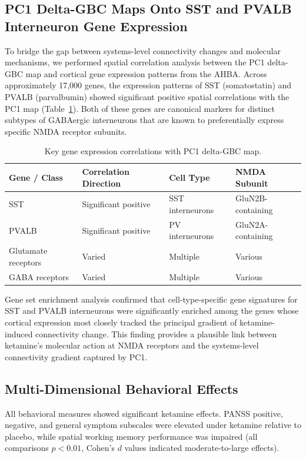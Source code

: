 \documentclass[12pt]{article}
\begin{document}
\subsection{PC1 Delta-GBC Maps Onto SST and PVALB Interneuron Gene Expression}

To bridge the gap between systems-level connectivity changes and molecular mechanisms, we performed spatial correlation analysis between the PC1 delta-GBC map and cortical gene expression patterns from the AHBA. Across approximately 17,000 genes, the expression patterns of SST (somatostatin) and PVALB (parvalbumin) showed significant positive spatial correlations with the PC1 map (Table~\ref{tab:gene_expression}). Both of these genes are canonical markers for distinct subtypes of GABAergic interneurons that are known to preferentially express specific NMDA receptor subunits.

\begin{table}[ht]
\centering
\caption{Key gene expression correlations with PC1 delta-GBC map.}
\label{tab:gene_expression}
\begin{tabular}{llll}
\toprule
Gene / Class & Correlation Direction & Cell Type & NMDA Subunit \\
\midrule
SST & Significant positive & SST interneurons & GluN2B-containing \\
PVALB & Significant positive & PV interneurons & GluN2A-containing \\
Glutamate receptors & Varied & Multiple & Various \\
GABA receptors & Varied & Multiple & Various \\
\bottomrule
\end{tabular}
\end{table}

Gene set enrichment analysis confirmed that cell-type-specific gene signatures for SST and PVALB interneurons were significantly enriched among the genes whose cortical expression most closely tracked the principal gradient of ketamine-induced connectivity change. This finding provides a plausible link between ketamine's molecular action at NMDA receptors and the systems-level connectivity gradient captured by PC1.

\subsection{Multi-Dimensional Behavioral Effects}

All behavioral measures showed significant ketamine effects. PANSS positive, negative, and general symptom subscales were elevated under ketamine relative to placebo, while spatial working memory performance was impaired (all comparisons $p < 0.01$, Cohen's $d$ values indicated moderate-to-large effects).
\end{document}
